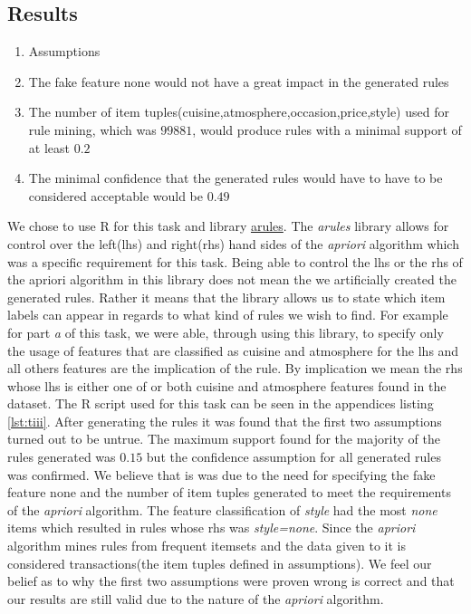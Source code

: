 \documentclass[letterpaper,10pt]{article}
\begin{document}
\subsection*{Results}
\begin{enumerate}
\item[] Assumptions 
\item The fake feature none would not have a great impact in the generated rules
\item The number of item tuples(cuisine,atmosphere,occasion,price,style) used for rule mining, which was $99881$, would produce rules with a minimal support of at least $0.2$
\item The minimal confidence that the generated rules would have to have to be considered acceptable would be $0.49$
\end{enumerate} 
We chose to use R for this task and library \href{https://cran.r-project.org/web/packages/arules/index.html}{arules}. The \textit{arules} library allows for control over the left(lhs) and right(rhs) hand sides of the \textit{apriori} algorithm which was a specific requirement for this task. Being able to control the lhs or the rhs of the apriori algorithm in this library does not mean the we artificially created the generated rules. Rather it means that the library allows us to state which item labels can appear in regards to what kind of rules we wish to find. For example for part \textit{a} of this task, we were able, through using this library, to specify only the usage of features that are classified as cuisine and atmosphere for the lhs and all others features are the implication of the rule. By implication we mean the rhs whose lhs is either one of or both cuisine and atmosphere features found in the dataset. The R script used for this task can be seen in the appendices listing \hyperref[lst:tiii]{\ref{lst:tiii}}. \newline \newline
After generating the rules it was found that the first two assumptions turned out to be untrue. The maximum support found for the majority of the rules generated was $0.15$ but the confidence assumption for all generated rules was confirmed. We believe that is was due to the need for specifying the fake feature none and the number of item tuples generated to meet the requirements of the \textit{apriori} algorithm. The feature classification of \textit{style} had the most \textit{none} items which resulted in rules whose rhs was \textit{style=none}. Since the \textit{apriori} algorithm mines rules from frequent itemsets and the data given to it is considered transactions(the item tuples defined in assumptions). We feel our belief as to why the first two assumptions were proven wrong is correct and that our results are still valid due to the nature of the \textit{apriori} algorithm. \newline \newline
\end{document}
